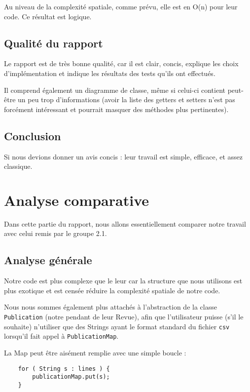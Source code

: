 \documentclass[a4paper,10pt]{article}
\begin{document}
	Au niveau de la complexité spatiale, comme prévu, elle est en O(n) pour leur code. Ce résultat est logique.

\subsection{Qualité du rapport}

	Le rapport est de très bonne qualité, car il est clair, concis, explique les choix d'implémentation et indique les résultats des tests qu'ils ont effectués. 
	
	Il comprend également un diagramme de classe, même si celui-ci contient peut-être un peu trop d'informations (avoir la liste des getters et setters n'est pas forcément intéressant et pourrait masquer des méthodes plus pertinentes).

\subsection{Conclusion}

	Si nous devions donner un avis concis : leur travail est simple, efficace, et assez classique.



\section{Analyse comparative}

	Dans cette partie du rapport, nous allons essentiellement comparer notre travail avec celui remis par le groupe 2.1.
	
\subsection{Analyse générale}

	Notre code est plus complexe que le leur car la structure que nous utilisons est plus exotique et est censée réduire la complexité spatiale de notre code.
	
	Nous nous sommes également plus attachés à l'abstraction de la classe \texttt{Publication} (notre pendant de leur Revue), afin que l'utilisateur puisse (s'il le souhaite) n'utiliser que des Strings ayant le format standard du fichier \texttt{csv} lorsqu'il fait appel à \texttt{PublicationMap}.

	La Map peut être aisément remplie avec une simple boucle :
	
	\vspace{0.4cm}
	\begin{lstlisting}
	for ( String s : lines ) {
		publicationMap.put(s);
	}
	\end{lstlisting}
	
\end{document}
